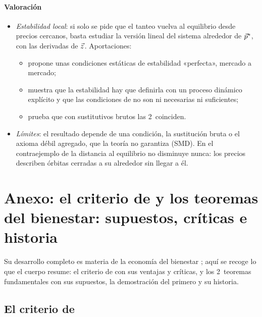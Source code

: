 \documentclass[11pt]{article}
\begin{document}
\paragraph{Valoración}

\begin{itemize}
\item \emph{Estabilidad local}: si solo se pide que el tanteo vuelva al equilibrio desde precios cercanos, basta estudiar la versión lineal del sistema alrededor de $\vec{p}^*$, con las derivadas de $\vec{z}$. Aportaciones:
  \begin{itemize}
  \item \textcite{Hicks1939Value} propone unas condiciones estáticas de estabilidad «perfecta», mercado a mercado;
  \item \textcite{Samuelson1941Stability} muestra que la estabilidad hay que definirla con un proceso dinámico explícito y que las condiciones de  no son ni necesarias ni suficientes;
  \item \textcite{Metzler1945Stability} prueba que con sustitutivos brutos las 2~coinciden.
  \end{itemize}
\item \emph{Límites}: el resultado depende de una condición, la sustitución bruta o el axioma débil agregado, que la teoría no garantiza (SMD). En el contraejemplo de \textcite{Scarf1960Examples} la distancia al equilibrio no disminuye nunca: los precios describen órbitas cerradas a su alrededor sin llegar a él.
\end{itemize}

\section{Anexo: el criterio de  y los teoremas del bienestar:\cortetitulo{} supuestos, críticas e historia}\label{anexo:pareto}

Su desarrollo completo es materia de la economía del bienestar ; aquí se recoge lo que el cuerpo resume: el criterio de  con sus ventajas y críticas, y los 2~teoremas fundamentales con sus supuestos, la demostración del primero y su historia.

\subsection{El criterio de }\label{anexo:criterio-pareto}
\end{document}
